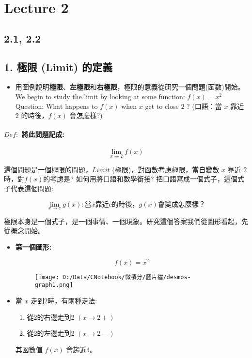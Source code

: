 \documentclass[]{article}
\date{}
\let\oldparagraph\paragraph
\renewcommand{\paragraph}[1]{\oldparagraph{#1}\mbox{}}
\begin{document}
\section{Lecture 2}\label{header-n0}

\subsection{2.1, 2.2}\label{header-n2}

\subsection{1. 極限 (Limit) 的定義}\label{header-n3}

\begin{itemize}
\item
  用圖例說明\textbf{極限}、\textbf{左極限}和\textbf{右極限}，極限的意義從研究一個問題(函數)開始。
  We begin to study the limit by looking at some function:
  \(f\left( x\right) =x^{2}\) Question: What happens to \(f(x)\) when
  \(x\) get to close \(2\) ? (口語：當 \(x\) 靠近 \(2\) 的時後，\(f(x)\)
  會怎麼樣?)
\end{itemize}

\paragraph{\texorpdfstring{\(Def:\)
將此問題記成:}{Def: 將此問題記成:}}\label{header-n11}

\[\lim _{x\rightarrow 2}f\left( x\right)\]

這個問題是一個極限的問題，\(Limit\) (極限)，對函數考慮極限，當自變數
\(x\) 靠近 \(2\) 時，對\(f(x)\)的考慮是? 如何用將口語和數學銜接?
把口語寫成一個式子，這個式子代表這個問題:

\[\lim _{x\rightarrow c}g\left( x\right):  當 x 靠近 c 的時後，g(x) 會變成怎麼樣？\]

極限本身是一個式子，是一個事情、一個現象。研究這個答案我們從圖形看起，先從概念開始。

\begin{itemize}
\item
  \textbf{第一個圖形:}

  \[f(x) = x^2\]

  \begin{figure}
  \centering
  \texttt{[image: D:/Data/CNotebook/微積分/圖片檔/desmos-graph1.png]}
  \caption{}
  \end{figure}
\item
  當 \(x\) 走到2時，有兩種走法:

  \begin{enumerate}
  \def\labelenumi{\arabic{enumi}.}
  \item
    從2的右邊走到2 \((x→2+)\)
  \item
    從2的左邊走到2 \((x→2-)\)
  \end{enumerate}

  其函數值 \(f(x)\) 會趨近4。
\end{itemize}
\end{document}
